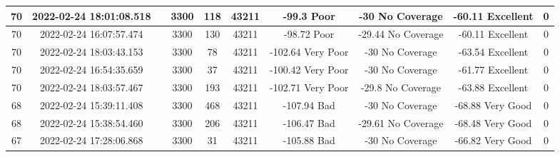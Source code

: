 \begin{longtable*}{|c|c|c|c|c|c|c|c|c|c|}
70&2022-02-24 18:01:08.518&&3300&118&43211& -99.3     Poor        & -30       No Coverage & -60.11    Excellent   & 0\\\hline
{}70&2022-02-24 16:07:57.474&&3300&130&43211& -98.72    Poor        & -29.44    No Coverage & -60.11    Excellent   & 0\\\hline
{}70&2022-02-24 18:03:43.153&&3300&78&43211& -102.64   Very Poor   & -30       No Coverage & -63.54    Excellent   & 0\\\hline
{}70&2022-02-24 16:54:35.659&&3300&37&43211& -100.42   Very Poor   & -30       No Coverage & -61.77    Excellent   & 0\\\hline
{}70&2022-02-24 18:03:57.467&&3300&193&43211& -102.71   Very Poor   & -29.8     No Coverage & -63.88    Excellent   & 0\\\hline
{}68&2022-02-24 15:39:11.408&&3300&468&43211& -107.94   Bad         & -30       No Coverage & -68.88    Very Good   & 0\\\hline
{}68&2022-02-24 15:38:54.460&&3300&206&43211& -106.47   Bad         & -29.61    No Coverage & -68.48    Very Good   & 0\\\hline
{}67&2022-02-24 17:28:06.868&&3300&31&43211& -105.88   Bad         & -30       No Coverage & -66.82    Very Good   & 0\\\hline

\end{longtable*}
